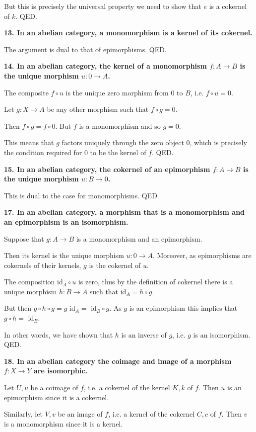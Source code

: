 \documentclass[12pt]{article}
\begin{document}
But this is precisely the universal property we need to show that $e$ is a cokernel of $k$. QED.

\textbf{13. In an abelian category, a monomorphism is a kernel of its cokernel.}

The argument is dual to that of epimorphisms. QED.

\textbf{14. In an abelian category, the kernel of a monomorphism $f : A \to B$ is the unique morphism $u : 0 \to A$.}

The composite $f\circ u$ is the unique zero morphism from $0$ to $B$, i.e. $f\circ u = 0$.

Let $g : X \to A$ be any other morphism such that $f\circ g = 0$. 

Then $f\circ g = f\circ 0$. But $f$ is a monomorphism and so $g = 0$. 

This means that $g$ factors uniquely through the zero object $0$, which is precisely the condition required for $0$ to be the kernel of $f$. QED.

\textbf{15. In an abelian category, the cokernel of an epimorphism $f : A \to B$ is the unique morphism $u : B \to 0$.}

This is dual to the case for monomorphisms. QED.

\textbf{17. In an abelian category, a morphism that is a monomorphism and an epimorphism is an isomorphism.}

Suppose that $g : A \to B$ is a monomorphism and an epimorphism.

Then its kernel is the unique morphism $u : 0 \to A$. Moreover, as epimorphisms are cokernels of their kernels, $g$ is the cokernel of $u$. 

The composition id$_A\circ u$ is zero, thus by the definition of cokernel there is a unique morphism $h : B \to A$ such that id$_A = h\circ g$.

But then $g\circ h\circ g = g$ id$_A =$ id$_B\circ g$. As $g$ is an epimorphism this implies that $g\circ h =$ id$_B$.

In other words, we have shown that $h$ is an inverse of $g$, i.e. $g$ is an isomorphism. QED.

\textbf{18. In an abelian category the coimage and image of a morphism $f : X \to Y$ are isomorphic.}

Let $U, u$ be a coimage of $f$, i.e. a cokernel of the kernel $K, k$ of $f$. Then $u$ is an epimorphism since it is a cokernel.

Similarly, let $V, v$ be an image of $f$, i.e. a kernel of the cokernel $C, c$ of $f$. Then $v$ is a monomorphism since it is a kernel.
\end{document}
